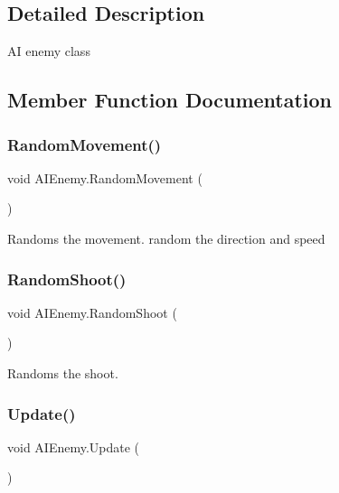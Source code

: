 \subsection{Detailed Description}
AI enemy class 



\subsection{Member Function Documentation}
\mbox{\label{class_a_i_enemy_a32f92c6e43ffa24333f6787f503b4ca9}} 
\subsubsection{\texorpdfstring{Random\+Movement()}{RandomMovement()}}
{\footnotesize\ttfamily void A\+I\+Enemy.\+Random\+Movement (\begin{DoxyParamCaption}{ }\end{DoxyParamCaption})\hspace{0.3cm}{\ttfamily [private]}}



Randoms the movement. random the direction and speed 

\mbox{\label{class_a_i_enemy_a7242a44e9015cb450f194faf94aff25e}} 
\subsubsection{\texorpdfstring{Random\+Shoot()}{RandomShoot()}}
{\footnotesize\ttfamily void A\+I\+Enemy.\+Random\+Shoot (\begin{DoxyParamCaption}{ }\end{DoxyParamCaption})\hspace{0.3cm}{\ttfamily [private]}}



Randoms the shoot. 

\mbox{\label{class_a_i_enemy_a2bc4af5eb1ce9ad274b1fe9bdc4ad07c}} 
\subsubsection{\texorpdfstring{Update()}{Update()}}
{\footnotesize\ttfamily void A\+I\+Enemy.\+Update (\begin{DoxyParamCaption}{ }\end{DoxyParamCaption})\hspace{0.3cm}{\ttfamily [private]}}



